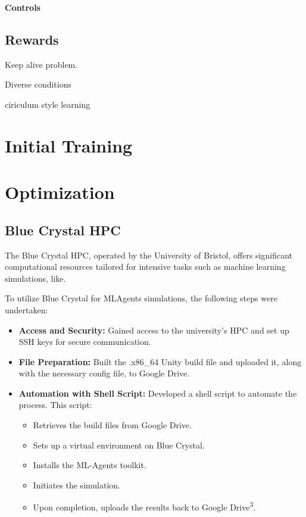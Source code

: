 \textbf{Controls}



\subsection{Rewards}
Keep alive problem.

Diverse conditions

ciriculum style learning

\section{Initial Training}

\section{Optimization}

\subsection{Blue Crystal HPC}

The Blue Crystal HPC, operated by the University of Bristol, offers significant computational resources tailored for intensive tasks such as machine learning simulations, like.


To utilize Blue Crystal for MLAgents simulations, the following steps were undertaken:

\begin{itemize}
    \item \textbf{Access and Security:} Gained access to the university's HPC and set up SSH keys for secure communication.
    \item \textbf{File Preparation:} Built the .x86\_64 Unity build file and uploaded it, along with the necessary config file, to Google Drive.
    \item \textbf{Automation with Shell Script:} Developed a shell script to automate the process. This script:
    \begin{itemize}
        \item Retrieves the build files from Google Drive.
        \item Sets up a virtual environment on Blue Crystal.
        \item Installs the ML-Agents toolkit.
        \item Initiates the simulation.
        \item Upon completion, uploads the results back to Google Drive\textsuperscript{3}.
    \end{itemize}
\end{itemize}

